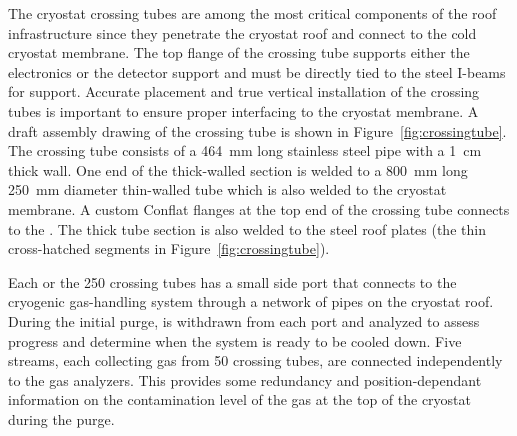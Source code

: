The cryostat crossing tubes are among the most critical components of the roof infrastructure since they penetrate the cryostat roof and connect to the cold cryostat membrane. The top flange of the crossing tube supports either the electronics \fdth or the detector support \fdth and must be directly tied to the steel I-beams for support. 
Accurate placement and true vertical installation of the crossing tubes is important to ensure proper interfacing to the cryostat membrane. 
A draft assembly drawing of the crossing tube is shown in Figure~\ref{fig:crossingtube}. 
The crossing tube consists of a \SI{464}{mm} long stainless steel pipe with a \SI{1}{cm} thick wall. 
One end of the thick-walled section is welded to a \SI{800}{mm} long \SI{250}{mm} diameter thin-walled tube which is also welded to the cryostat membrane.
A custom Conflat flanges at the top end of the crossing tube connects to the \fdth. 
The thick tube section is also welded to the steel roof plates (the thin cross-hatched segments in Figure~\ref{fig:crossingtube}).  


 
Each or the 250 crossing tubes has a small side port that  connects to the cryogenic gas-handling system through a network of pipes on the cryostat roof. During the initial  purge,   is withdrawn from each port and analyzed to assess progress and determine when the system is ready to be cooled down. Five  streams, each collecting gas from 50 crossing tubes, are connected independently to the gas analyzers. This provides some redundancy and position-dependant information on the contamination level of the gas at the top of the cryostat during the purge.
 
